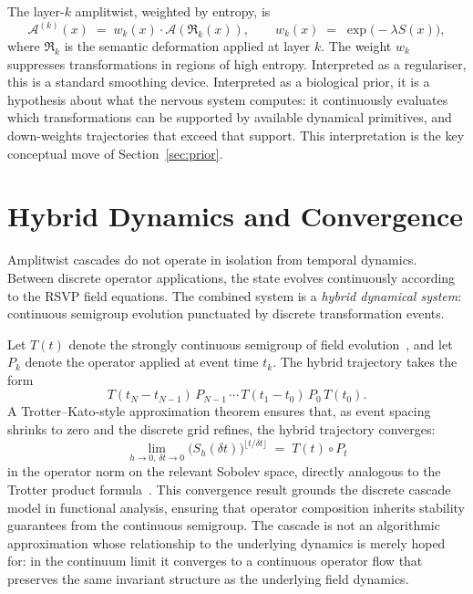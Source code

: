 \documentclass[12pt, a4paper]{article}
\theoremstyle{remark}
\theoremstyle{definition}
\newcommand{\A}{\mathcal{A}}
\newcommand{\Rk}{\mathfrak{R}}
\begin{document}
The layer-$k$ amplitwist, weighted by entropy, is
\begin{equation}
  \A^{(k)}(x) \;=\; w_k(x)\cdot \A\!\left(\Rk_k(x)\right), \qquad
  w_k(x) \;=\; \exp\!\bigl(-\lambda S(x)\bigr),
  \label{eq:weighted}
\end{equation}
where $\Rk_k$ is the semantic deformation applied at layer $k$.  The weight $w_k$
suppresses transformations in regions of high entropy.  Interpreted as a regulariser, this
is a standard smoothing device.  Interpreted as a biological prior, it is a hypothesis
about what the nervous system computes: it continuously evaluates which transformations can
be supported by available dynamical primitives, and down-weights trajectories that exceed
that support.  This interpretation is the key conceptual move of Section~\ref{sec:prior}.

\section{Hybrid Dynamics and Convergence}
\label{sec:hybrid}

Amplitwist cascades do not operate in isolation from temporal dynamics.  Between discrete
operator applications, the state evolves continuously according to the RSVP field
equations.  The combined system is a \emph{hybrid dynamical system}: continuous semigroup
evolution punctuated by discrete transformation events.

Let $T(t)$ denote the strongly continuous semigroup of field evolution~\cite{engel2000one,pazy1983semigroups}, and let $P_k$ denote the
operator applied at event time $t_k$.  The hybrid trajectory takes the form
\begin{equation}
  T(t_N - t_{N-1})\, P_{N-1}\, \cdots\, T(t_1 - t_0)\, P_0\, T(t_0).
  \label{eq:hybrid}
\end{equation}
A Trotter--Kato-style approximation theorem ensures that, as event spacing shrinks to zero
and the discrete grid refines, the hybrid trajectory converges:
\begin{equation}
  \lim_{h \to 0,\, \delta t \to 0}
  \bigl(S_h(\delta t)\bigr)^{\lfloor t/\delta t\rfloor}
  \;=\; T(t) \circ P_t
  \label{eq:trotterkato}
\end{equation}
in the operator norm on the relevant Sobolev space, directly analogous to the Trotter product formula~\cite{trotter1959product,kato1978trotter}.  This convergence result grounds the
discrete cascade model in functional analysis, ensuring that operator composition inherits
stability guarantees from the continuous semigroup.  The cascade is not an algorithmic
approximation whose relationship to the underlying dynamics is merely hoped for: in the
continuum limit it converges to a continuous operator flow that preserves the same
invariant structure as the underlying field dynamics.
\end{document}
